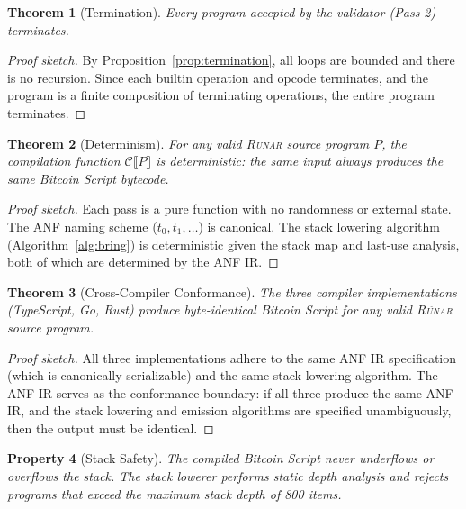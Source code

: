 \documentclass[11pt,a4paper]{article}
\newtheorem{theorem}{Theorem}[section]
\newtheorem{property}[theorem]{Property}
\newcommand{\runar}{\textsc{Rúnar}}
\newcommand{\compile}[1]{\mathcal{C}\llbracket #1 \rrbracket}
\begin{document}
\begin{theorem}[Termination]
\label{thm:termination}
Every program accepted by the validator (Pass 2) terminates.
\end{theorem}

\begin{proof}[Proof sketch]
By Proposition~\ref{prop:termination}, all loops are bounded and there is
no recursion. Since each builtin operation and opcode terminates, and the
program is a finite composition of terminating operations, the entire
program terminates.
\end{proof}

\begin{theorem}[Determinism]
\label{thm:determinism}
For any valid \runar{} source program $P$, the compilation function
$\compile{P}$ is deterministic: the same input always produces the same
Bitcoin Script bytecode.
\end{theorem}

\begin{proof}[Proof sketch]
Each pass is a pure function with no randomness or external state. The
ANF naming scheme ($t_0, t_1, \ldots$) is canonical. The stack lowering
algorithm (Algorithm~\ref{alg:bring}) is deterministic given the stack
map and last-use analysis, both of which are determined by the ANF IR.
\end{proof}

\begin{theorem}[Cross-Compiler Conformance]
\label{thm:conformance}
The three compiler implementations (TypeScript, Go, Rust) produce
byte-identical Bitcoin Script for any valid \runar{} source program.
\end{theorem}

\begin{proof}[Proof sketch]
All three implementations adhere to the same ANF IR specification (which
is canonically serializable) and the same stack lowering algorithm. The
ANF IR serves as the conformance boundary: if all three produce the same
ANF IR, and the stack lowering and emission algorithms are specified
unambiguously, then the output must be identical.
\end{proof}

\begin{property}[Stack Safety]
\label{prop:stack-safety}
The compiled Bitcoin Script never underflows or overflows the stack.
The stack lowerer performs static depth analysis and rejects programs that
exceed the maximum stack depth of 800 items.
\end{property}
\end{document}
